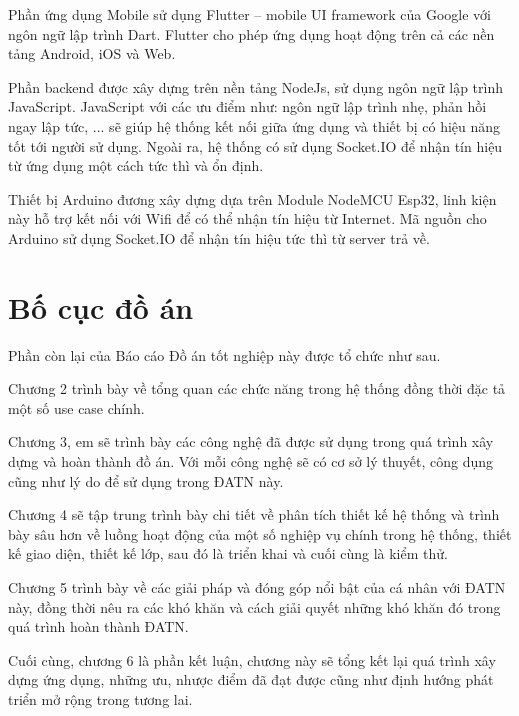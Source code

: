\documentclass[../DoAn.tex]{subfiles}
\begin{document}
Phần ứng dụng Mobile sử dụng Flutter\cite{Flutter} – mobile UI framework của Google với ngôn ngữ lập trình Dart\cite{Dart}. Flutter cho phép ứng dụng hoạt động trên cả các nền tảng Android, iOS và Web.

Phần backend được xây dựng trên nền tảng NodeJs\cite{NodeJS}, sử dụng ngôn ngữ lập trình JavaScript. JavaScript với các ưu điểm như: ngôn ngữ lập trình nhẹ, phản hồi ngay lập tức, ... sẽ giúp hệ thống kết nối giữa ứng dụng và thiết bị có hiệu năng tốt tới người sử dụng. Ngoài ra, hệ thống có sử dụng Socket.IO để nhận tín hiệu từ ứng dụng một cách tức thì và ổn định.

Thiết bị Arduino đương xây dựng dựa trên Module NodeMCU Esp32\cite{ESP32-WROOM-32}, linh kiện này hỗ trợ kết nối với Wifi để có thể nhận tín hiệu từ Internet. Mã nguồn cho Arduino sử dụng Socket.IO để nhận tín hiệu tức thì từ server trả về.

\section{Bố cục đồ án}
\label{section:1.4}
Phần còn lại của Báo cáo Đồ án tốt nghiệp này được tổ chức như sau. 

Chương 2 trình bày về tổng quan các chức năng trong hệ thống đồng thời đặc tả một số use case chính.

Chương 3, em sẽ trình bày các công nghệ đã được sử dụng trong quá trình xây dựng và hoàn thành đồ án. Với mỗi công nghệ sẽ có cơ sở lý thuyết, công dụng cũng như lý do để sử dụng trong ĐATN này.

Chương 4 sẽ tập trung trình bày chi tiết về phân tích thiết kế hệ thống và trình bày sâu hơn về luồng hoạt động của một số nghiệp vụ chính trong hệ thống, thiết kế giao diện, thiết kế lớp, sau đó là triển khai và cuối cùng là kiểm thử.

Chương 5 trình bày về các giải pháp và đóng góp nổi bật của cá nhân với ĐATN này, đồng thời nêu ra các khó khăn và cách giải quyết những khó khăn đó trong quá trình hoàn thành ĐATN.

Cuối cùng, chương 6 là phần kết luận, chương này sẽ tổng kết lại quá trình xây dựng ứng dụng, những ưu, nhược điểm đã đạt được cũng như định hướng phát triển mở rộng trong tương lai.
\end{document}
